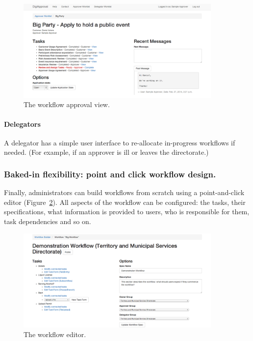 \documentclass[12pt,a4paper,twosided]{article}
\begin{document}
\begin{figure}[h!]
  \centering
  \includegraphics[width=0.9\textwidth]{internal-view.png}
  \caption{The workflow approval view.}
  \label{fig:approver-workflow}
\end{figure}

\paragraph{Delegators}

A delegator has a simple user interface to re-allocate in-progress
workflows if needed. (For example, if an approver is ill or leaves the
directorate.)

\subsubsection{Baked-in flexibility: point and click workflow design.}

Finally, administrators can build workflows from scratch using a
point-and-click editor (Figure~\ref{fig:workflow-editor}). All aspects of the workflow can be configured:
the tasks, their specifications, what information is provided to users,
who is responsible for them, task dependencies and so on.

\begin{figure}[h!]
  \centering
  \includegraphics[width=0.9\textwidth]{workflow-editor.png}
  \caption{The workflow editor.}
  \label{fig:workflow-editor}
\end{figure}
\end{document}
